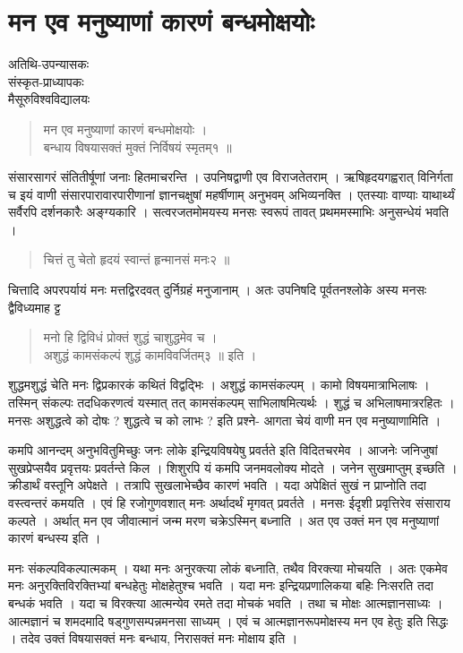 \chapter{मन एव मनुष्याणां कारणं बन्धमोक्षयोः }

\begin{center}
\smallskip
अतिथि-उपन्यासकः\\
संस्कृत-प्राध्यापकः\\
मैसूरुविश्वविद्यालयः
\end{center}
\begin{verse}
मन एव मनुष्याणां कारणं बन्धमोक्षयोः ।\\
बन्धाय विषयासक्तं मुक्तं निर्विषयं स्मृतम्१ ॥
\end{verse}
संसारसागरं संतितीर्षूणां जनाः हितमाचरन्ति । उपनिषद्वाणी एव विराजतेतराम् । ऋषिहृदयगह्वरात् विनिर्गता च इयं वाणी संसारपारावारपारीणानां ज्ञानचक्षुषां महर्षीणाम् अनुभवम् अभिव्यनक्ति । एतस्याः वाण्याः याथार्थ्यं सर्वैरपि दर्शनकारैः अङ्ग्यकारि । सत्वरजतमोमयस्य मनसः स्वरूपं तावत् प्रथममस्माभिः अनुसन्धेयं भवति ।
\begin{verse}
चित्तं तु चेतो हृदयं स्वान्तं हृन्मानसं मनः२ ॥
\end{verse}
चित्तादि अपरपर्यायं मनः मत्तद्विरदवत् दुर्निग्रहं मनुजानाम् । अतः उपनिषदि पूर्वतनश्लोके अस्य मनसः द्वैविध्यमाह ट्ट 
\begin{verse}
मनो हि द्विविधं प्रोक्तं शुद्धं चाशुद्धमेव च ।\\
अशुद्धं कामसंकल्पं शुद्धं कामविवर्जितम्३ ॥ इति ।
\end{verse}
शुद्धमशुद्धं चेति मनः द्विप्रकारकं कथितं विद्वद्भिः । अशुद्धं कामसंकल्पम् । कामो विषयमात्राभिलाषः । तस्मिन् संकल्पः तदधिकरणत्वं यस्मात् तत् कामसंकल्पम् साभिलाषमित्यर्थः । शुद्धं च अभिलाषमात्ररहितः । मनसः अशुद्धत्वे को दोषः ? शुद्धत्वे च को लाभः ? इति प्रश्ने- आगता चेयं वाणी मन एव मनुष्याणामिति ।   

कमपि आनन्दम् अनुभवितुमिच्छुः जनः लोके इन्द्रियविषयेषु प्रवर्तते इति विदितचरमेव । आजनेः जनिजुषां सुखप्रेप्सयैव प्रवृत्तयः प्रवर्तन्ते किल । शिशुरपि यं कमपि जनमवलोक्य मोदते । जनेन सुखमाप्तुम् इच्छति । क्रीडार्थं वस्तूनि अपेक्षते । तत्रापि सुखलाभेच्छैव कारणं भवति । यदा अपेक्षितं सुखं न प्राप्नोति तदा वस्त्वन्तरं कमयति । एवं हि रजोगुणवशात् मनः अर्थादर्थं मृगवत् प्रवर्तते । मनसः ईदृशी प्रवृत्तिरेव संसाराय कल्पते । अर्थात् मन एव जीवात्मानं जन्म मरण चक्रेऽस्मिन् बध्नाति । अत एव उक्तं मन एव मनुष्याणां कारणं बन्धस्य इति । 

मनः संकल्पविकल्पात्मकम् । यथा मनः अनुरक्त्या लोकं बध्नाति, तथैव विरक्त्या मोचयति । अतः एकमेव मनः अनुरक्तिविरक्तिभ्यां बन्धहेतुः मोक्षहेतुश्च भवति । यदा मनः इन्द्रियप्रणालिकया बहिः निःसरति तदा बन्धकं भवति । यदा च विरक्त्या आत्मन्येव रमते तदा मोचकं भवति । तथा च मोक्षः आत्मज्ञानसाध्यः । आत्मज्ञानं च शमदमादि षड्गुणसम्पन्नमनसा साध्यम् । एवं च आत्मज्ञानरूपमोक्षस्य मन एव हेतुः इति सिद्धः । तदेव उक्तं विषयासक्तं मनः बन्धाय, निरासक्तं मनः मोक्षाय इति ।

